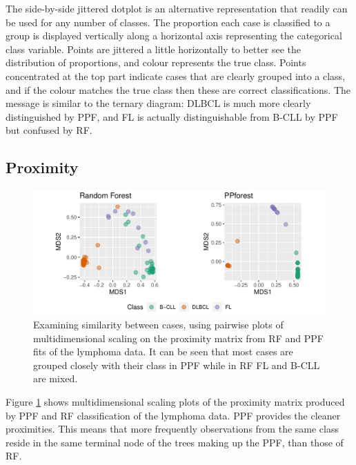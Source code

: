 \documentclass[12pt]{article}\usepackage[]{graphicx}\usepackage[]{color}
\makeatletter
\def\maxwidth{ %
  \ifdim\Gin@nat@width>\linewidth
    \linewidth
  \else
    \Gin@nat@width
  \fi
}
\newenvironment{knitrout}{}{} %
\makeatother
\begin{document}
The side-by-side jittered dotplot is an alternative representation that readily can be used for any number of classes. The proportion each case is classified to a group is displayed vertically along a horizontal axis representing the categorical class variable. Points are jittered a little horizontally to better see the distribution of proportions, and colour represents the true class. Points concentrated at the top part indicate cases that are clearly grouped into a class, and if the colour matches the true class then these are correct classifications. The message is similar to the ternary diagram: DLBCL is much more clearly distinguished by PPF, and FL is actually distinguishable from B-CLL by PPF but confused by RF.


\subsection{Proximity}

\begin{figure}[!ht]
\centering
\begin{knitrout}
\color{fgcolor}
\includegraphics[width=\maxwidth]{figure/mds-1} 

\end{knitrout}
\caption{Examining similarity between cases, using pairwise plots of multidimensional scaling on the proximity matrix from RF and PPF fits of the lymphoma data. It can be seen that most cases are grouped closely with their class in PPF while in RF FL and B-CLL are mixed. \label{prox1}}
\end{figure}

Figure \ref{prox1} shows multidimensional scaling plots of the proximity matrix produced by PPF and RF classification of the lymphoma data. PPF provides the cleaner proximities. This means that more frequently observations from the same class reside in the same terminal node of the trees making up the PPF, than those of RF.
\end{document}
